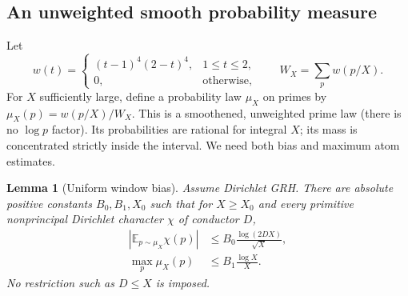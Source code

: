 \documentclass[11pt]{article}
\newtheorem{lemma}[theorem]{Lemma}
\theoremstyle{remark}\newtheorem{remark}[theorem]{Remark}
\newcommand{\E}{\mathbb E}
\begin{document}
\subsection{An unweighted smooth probability measure}
Let
\[
 w(t)=\begin{cases}(t-1)^4(2-t)^4,&1\le t\le2,\\0,&\text{otherwise},\end{cases}
 \qquad W_X=\sum_p w(p/X).
\]
For $X$ sufficiently large, define a probability law $\mu_X$ on primes by $\mu_X(p)=w(p/X)/W_X$. This is a smoothened, unweighted prime law (there is no $\log p$ factor). Its probabilities are rational for integral $X$; its mass is concentrated strictly inside the interval. We need both bias and maximum atom estimates.
\begin{lemma}[Uniform window bias]\label{lem:window}
Assume Dirichlet GRH. There are absolute positive constants $B_0,B_1,X_0$ such that for $X\ge X_0$ and every primitive nonprincipal Dirichlet character $\chi$ of conductor $D$,
\begin{align}
 \left|\E_{p\sim\mu_X}\chi(p)\right|&\le B_0\frac{\log(2DX)}{\sqrt X},\label{eq:bias}\\
 \max_p\mu_X(p)&\le B_1\frac{\log X}{X}.\label{eq:atom}
\end{align}
No restriction such as $D\le X$ is imposed.
\end{lemma}
\end{document}
